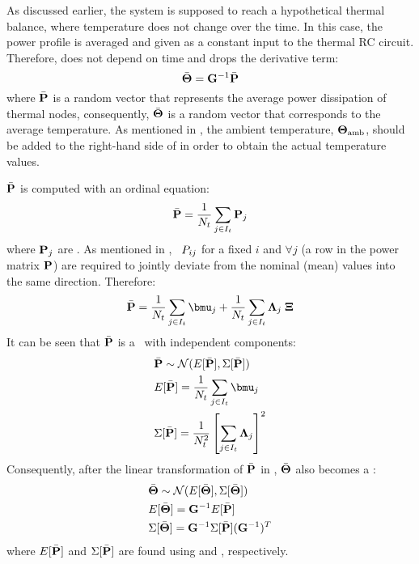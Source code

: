 As discussed earlier, the system is supposed to reach a hypothetical thermal balance, where temperature does not change over the time. In this case, the power profile is averaged and given as a constant input to the thermal RC circuit. Therefore,  does not depend on time and drops the derivative term:
\begin{equation} \equlabel{sss-fourier}
  \a{\vtemperature} = \mconductance^{-1} \a{\vpower}
\end{equation}
where $\bar{\mathbf{P}}$ is a random vector that represents the average power dissipation of thermal nodes, consequently, $\bar{\mathbf{\Theta}}$ is a random vector that corresponds to the average temperature. As mentioned in , the ambient temperature, $\mathbf{\Theta}_{\text{amb}}$, should be added to the right-hand side of  in order to obtain the actual temperature values.

$\bar{\mathbf{P}}$ is computed with an ordinal equation:
\[
  \bar{\mathbf{P}} = \frac{1}{N_t} \sum_{j \in I_t} \mathbf{P}_j
\]
where $\mathbf{P}_j$ are \mnrvs. As mentioned in , \rvs\ $P_{ij}$ for a fixed $i$ and $\forall j$ (a row in the power matrix $\mathbf{P}$) are required to jointly deviate from the nominal (mean) values into the same direction. Therefore:
\[
  \a{\vpower} = \frac{1}{\stepcount} \sum_{j \in \timeindex} \vmean{j} + \frac{1}{\stepcount} \sum_{j \in \timeindex} \ddeviation{j} \; \vstdnormal
\]
It can be seen that $\bar{\mathbf{P}}$ is a \mnrv\ with independent components:
\begin{align}
  & \a{\vpower} \sim \normal(\expectation{\a{\vpower}}, \covariance{\a{\vpower}}) \nonumber \\
  & \expectation{\a{\vpower}} = \frac{1}{\stepcount} \sum_{j \in \timeindex} \vmean{j} \equlabel{steady-power-mean} \\
  & \covariance{\a{\vpower}} = \frac{1}{\stepcount^2} \left[ \sum_{j \in \timeindex} \ddeviation{j} \right]^2 \equlabel{steady-power-covariance}
\end{align}
Consequently, after the linear transformation of $\bar{\mathbf{P}}$ in , $\bar{\mathbf{\Theta}}$ also becomes a \mnrv:
\begin{align*}
  & \bar{\mathbf{\Theta}} \sim \mathcal{N}(E[\bar{\mathbf{\Theta}}], \Sigma[\bar{\mathbf{\Theta}}]) \\
  & E[\bar{\mathbf{\Theta}}] = \mathbf{G}^{-1} E[\bar{\mathbf{P}}] \\
  & \Sigma[\bar{\mathbf{\Theta}}] = \mathbf{G}^{-1} \Sigma[\bar{\mathbf{P}}] (\mathbf{G}^{-1})^T
\end{align*}
where $E[\bar{\mathbf{P}}]$ and $\Sigma[\bar{\mathbf{P}}]$ are found using  and , respectively.
